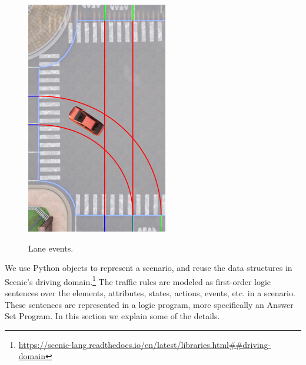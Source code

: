\begin{figure}
\begin{minipage}[t]{.3\linewidth}
    {\includegraphics[width=\linewidth]{figures/chapter4/lanes-exit.png}}%
  \end{minipage}%
  \caption{Lane events.}
  \label{fig:lane-events}%
\end{figure}%


We use Python objects to represent a scenario, and reuse the data structures in Scenic's driving domain.\footnote{\url{https://scenic-lang.readthedocs.io/en/latest/libraries.html##driving-domain}}
%
The traffic rules are modeled as first-order logic sentences over the elements, attributes, states, actions, events, etc. in a scenario.
%
These sentences are represented in a logic program, more specifically an Answer Set Program.
%
In this section we explain some of the details.


